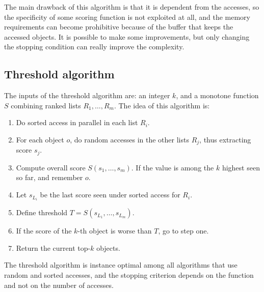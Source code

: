 \documentclass[12pt, a4paper]{report}
\newtheorem[style=M,bodystyle=\normalfont]{theorem}{Theorem}
\newtheorem[style=M,bodystyle=\normalfont]{corollary}{Corollary}
\newtheorem[style=M,bodystyle=\normalfont]{lemma}{Lemma}
\newtheorem[style=M,bodystyle=\normalfont]{definition}{Definition}
\begin{document}
    The main drawback of this algorithm is that it is dependent from the accesses, so the specificity of some scoring function is not exploited
    at all, and the memory requirements can become prohibitive because of the buffer that keeps the accessed objects. It is possible to make 
    some improvements, but only changing the stopping condition can really improve the complexity. 

    \subsection{Threshold algorithm}
    The inputs of the threshold algorithm are: an integer $k$, and a monotone function $S$ combining ranked lists $R_1,\dots,R_m$. 
    The idea of this algorithm is: 
    \begin{enumerate}
        \item Do sorted access in parallel in each list $R_i$. 
        \item For each object $o$, do random accesses in the other lists $R_j$, thus extracting score $s_j$. 
        \item Compute overall score $S(s_1, \dots, s_m)$. If the value is among the $k$ highest seen so far, and remember $o$. 
        \item Let $s_{L_i}$ be the last score seen under sorted access for $R_i$. 
        \item Define threshold $T=S(s_{L_1}, \dots, s_{L_m})$. 
        \item If the score of the $k$-th object is worse than $T$, go to step one. 
        \item Return the current top-$k$ objects. 
    \end{enumerate}
    The threshold algorithm is instance optimal among all algorithms that use random and sorted accesses, and the stopping criterion depends 
    on the function and not on the number of accesses. 
\end{document}
